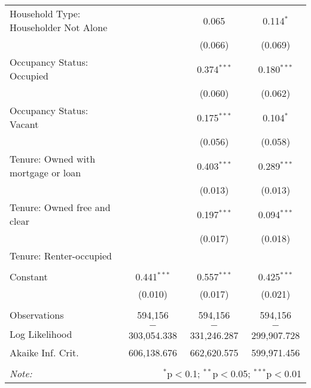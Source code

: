 \begin{longtable}{@{\extracolsep{5pt}}lccc}
  Household Type: Householder Not Alone &  & 0.065 & 0.114$^{*}$ \\ 
  &  & (0.066) & (0.069) \\ 
  Occupancy Status: Occupied &  & 0.374$^{***}$ & 0.180$^{***}$ \\ 
  &  & (0.060) & (0.062) \\ 
  Occupancy Status: Vacant &  & 0.175$^{***}$ & 0.104$^{*}$ \\ 
  &  & (0.056) & (0.058) \\ 
  Tenure: Owned with mortgage or loan &  & 0.403$^{***}$ & 0.289$^{***}$ \\ 
  &  & (0.013) & (0.013) \\ 
  Tenure: Owned free and clear &  & 0.197$^{***}$ & 0.094$^{***}$ \\ 
  &  & (0.017) & (0.018) \\ 
  Tenure: Renter-occupied &  &  &  \\ 
  &  &  &  \\ 
  Constant & 0.441$^{***}$ & 0.557$^{***}$ & 0.425$^{***}$ \\ 
  & (0.010) & (0.017) & (0.021) \\ 
 \hline \\[-1.8ex] 
Observations & 594,156 & 594,156 & 594,156 \\ 
Log Likelihood & $-$303,054.338 & $-$331,246.287 & $-$299,907.728 \\ 
Akaike Inf. Crit. & 606,138.676 & 662,620.575 & 599,971.456 \\ 
\hline 
\hline \\[-1.8ex] 
\textit{Note:}  & \multicolumn{3}{r}{$^{*}$p$<$0.1; $^{**}$p$<$0.05; $^{***}$p$<$0.01} \\ 
\end{longtable} 
\endgroup 
